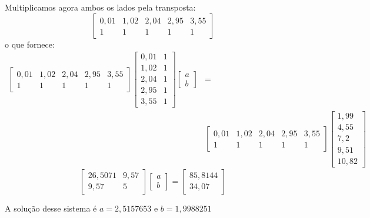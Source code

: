 \begin{sol}
Multiplicamos agora ambos os lados pela transposta:
\begin{equation*}
  \begin{bmatrix}
    0,01 &1,02 &2,04 &2,95 &3,55\\
    1 &1 &1 &1 &1
    \end{bmatrix}
\end{equation*}
o que fornece:
\begin{eqnarray*}
  \left[\begin{array}{ccccc}
      0,01 &1,02 &2,04 &2,95 &3,55\\
      1 &1 &1 &1 &1
    \end{array}
  \right]
  \left[\begin{array}{cc}
      0,01 &1\\
      1,02 &1\\
      2,04 &1\\
      2,95 &1\\
      3,55 &1
    \end{array}
  \right]
  \left[\begin{array}{c}
      a\\
      b
    \end{array}
  \right]
  &=&\\
  &\left[\begin{array}{ccccc}
      0,01 &1,02 &2,04 &2,95 &3,55\\
      1 &1 &1 &1 &1
    \end{array}
  \right]
  \left[\begin{array}{c}
      1,99\\
      4,55\\
      7,2\\
      9,51\\
      10,82
    \end{array}
  \right]  
\end{eqnarray*}
$$\left[
  \begin{array}{cc}
    26,5071  & 9,57 \\
    9,57  &     5
  \end{array}
\right]
\left[
  \begin{array}{c}
    a   \\
    b
  \end{array}
\right]=
\left[
  \begin{array}{c}
    85,8144  \\
    34,07
  \end{array}
\right]
$$

A solução desse sistema é $a=2,5157653$ e $b=1,9988251$


\end{sol}
